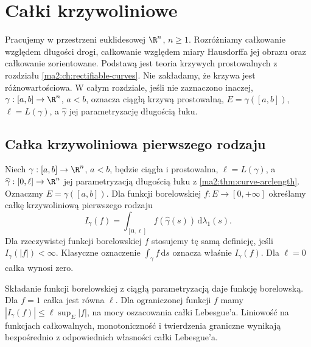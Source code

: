 \chapter{Całki krzywoliniowe}
\label{ma2:ch:line-integrals}

Pracujemy w przestrzeni euklidesowej $\R^n$,
$n\ge1$. Rozróżniamy całkowanie względem długości
drogi, całkowanie względem miary Hausdorffa jej
obrazu oraz całkowanie zorientowane.
Podstawą jest teoria krzywych prostowalnych
z rozdziału \ref{ma2:ch:rectifiable-curves}.
Nie zakładamy, że krzywa jest różnowartościowa.
W całym rozdziale, jeśli nie zaznaczono inaczej,
$\gamma:[a,b]\to\R^n$, $a<b$, oznacza ciągłą
krzywą prostowalną, $E=\gamma([a,b])$,
$\ell=L(\gamma)$, a $\widehat\gamma$ jej
parametryzację długością łuku.

\section{Całka krzywoliniowa pierwszego rodzaju}

\begin{definicja}
\label{ma2:def:line-first}
Niech $\gamma:[a,b]\to\R^n$, $a<b$, będzie
ciągła i prostowalna, $\ell=L(\gamma)$, a
$\widehat\gamma:[0,\ell]\to\R^n$ jej parametryzacją
długością łuku z \ref{ma2:thm:curve-arclength}.
Oznaczmy $E=\gamma([a,b])$.
Dla funkcji borelowskiej $f:E\to[0,+\infty]$
określamy całkę krzywoliniową pierwszego rodzaju
\[
 I_\gamma(f)=\int_{[0,\ell]} f(\widehat\gamma(s))\,
 \mathrm d\lambda_1(s).
\]
Dla rzeczywistej funkcji borelowskiej $f$ stosujemy
tę samą definicję, jeśli $I_\gamma(|f|)<\infty$.
Klasyczne oznaczenie $\int_\gamma f\,\mathrm ds$
oznacza właśnie $I_\gamma(f)$.
Dla $\ell=0$ całka wynosi zero.
\end{definicja}

Składanie funkcji borelowskiej z ciągłą
parametryzacją daje funkcję borelowską.
Dla $f=1$ całka jest równa $\ell$.
Dla ograniczonej funkcji $f$ mamy
$|I_\gamma(f)|\le \ell\sup_E|f|$,
na mocy oszacowania całki Lebesgue'a.
Liniowość na funkcjach całkowalnych,
monotoniczność i twierdzenia graniczne
wynikają bezpośrednio z odpowiednich własności
całki Lebesgue'a.

